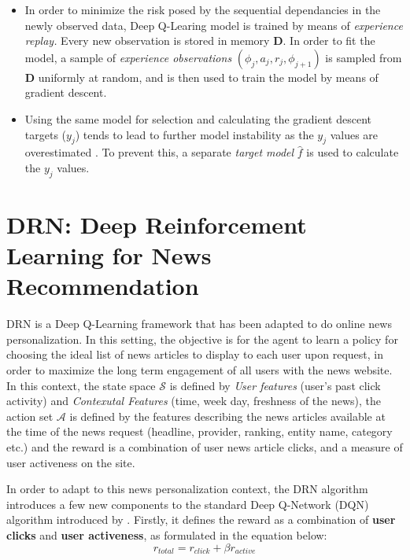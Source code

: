 \documentclass{mldsmsc}
\begin{document}
\begin{itemize}
    \item In order to minimize the risk posed by the sequential dependancies in the newly observed data, Deep Q-Learing
    model is trained by means of \emph{experience replay.} Every new observation is stored in memory $\mathbf{D}$. In order
    to fit the model, a sample of \emph{experience observations}  $(\phi_{j}, a_j, r_j, \phi_{j+1})$ is sampled from $\mathbf{D}$
    uniformly at random, and is then used to train the model by means of gradient descent.
    \item Using the same model for selection and calculating the gradient descent targets ($y_j$) tends to lead to further model instability as the $y_j$ values are overestimated \citep{RefWorks:mnih2015human-level}.
    To prevent this, a separate \emph{target model} $\hat{f}$ is used to calculate the $y_j$ values.
\end{itemize}

\section{DRN: Deep Reinforcement Learning for News Recommendation}
\label{sec:drn}

DRN \citep{RefWorks:zheng2018drn:} is a Deep Q-Learning framework 
that has been adapted to do online news personalization. In this setting, the objective is for the
agent to learn a policy for choosing the ideal list of news articles to display to each user upon request, 
in order to maximize
the long term engagement of all users with the news website. In this context, the state space $\mathcal{S}$
is defined by \emph{User features} (user's past click activity) and \emph{Contexutal Features} (time, week day,
freshness of the news),  the action set $\mathcal{A}$ is defined by the features describing the
news articles available at the time of the news request (headline, provider, ranking, entity name, category etc.)
and the reward is a combination of user news article clicks, and a measure of user activeness on the site.

In order to adapt to this news personalization context, the DRN algorithm introduces a few new components to the standard Deep Q-Network (DQN) algorithm introduced
by \cite{RefWorks:mnih2015human-level}. Firstly, it defines the reward as a combination of \textbf{user clicks}
and \textbf{user activeness}, as formulated in the equation below:
\begin{equation}
    r_{total} = r_{click} + \beta r_{active}
\end{equation}
\end{document}
